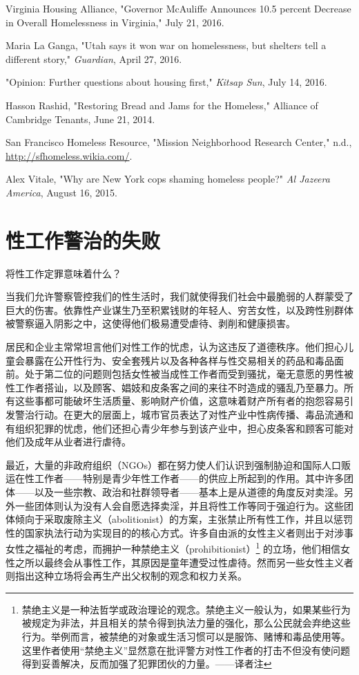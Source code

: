 \documentclass[fontset=fandol, a4paper, 12pt, openright]{ctexbook}
\begin{document}
\begin{enumerate}[label={[\arabic*]}]
    \item Virginia Housing Alliance, "Governor McAuliffe Announces 10.5 percent Decrease in Overall Homelessness in Virginia," July 21, 2016.
    \item Maria La Ganga, "Utah says it won war on homelessness, but shelters tell a different story," \textit{Guardian}, April 27, 2016.
    \item "Opinion: Further questions about housing first," \textit{Kitsap Sun}, July 14, 2016.
    \item Hasson Rashid, "Restoring Bread and Jams for the Homeless," Alliance of Cambridge Tenants, June 21, 2014.
    \item San Francisco Homeless Resource, "Mission Neighborhood Research Center," n.d., \url{http://sfhomeless.wikia.com/}.
    \item Alex Vitale, "Why are New York cops shaming homeless people?" \textit{Al Jazeera America}, August 16, 2015.
\end{enumerate}

\chapter{性工作警治的失败}

将性工作定罪意味着什么？

当我们允许警察管控我们的性生活时，我们就使得我们社会中最脆弱的人群蒙受了巨大的伤害。依靠性产业谋生乃至积累钱财的年轻人、穷苦女性，以及跨性别群体被警察逼入阴影之中，这使得他们极易遭受虐待、剥削和健康损害。

居民和企业主常常坦言他们对性工作的忧虑，认为这违反了道德秩序。他们担心儿童会暴露在公开性行为、安全套残片以及各种各样与性交易相关的药品和毒品面前。处于第二位的问题则包括女性被当成性工作者而受到骚扰，毫无意愿的男性被性工作者搭讪，以及顾客、娼妓和皮条客之间的来往不时造成的骚乱乃至暴力。所有这些事都可能破坏生活质量、影响财产价值，这意味着财产所有者的抱怨容易引发警治行动。在更大的层面上，城市官员表达了对性产业中性病传播、毒品流通和有组织犯罪的忧虑，他们还担心青少年参与到该产业中，担心皮条客和顾客可能对他们及成年从业者进行虐待。

最近，大量的非政府组织（NGOs）都在努力使人们认识到强制胁迫和国际人口贩运在性工作者——特别是青少年性工作者——的供应上所起到的作用。其中许多团体——以及一些宗教、政治和社群领导者——基本上是从道德的角度反对卖淫。另外一些团体则认为没有人会自愿选择卖淫，并且将性工作等同于强迫行为。这些团体倾向于采取废除主义（abolitionist）的方案，主张禁止所有性工作，并且以惩罚性的国家执法行动为实现目的的核心方式。许多自由派的女性主义者则出于对涉事女性之福祉的考虑，而拥护一种禁绝主义（prohibitionist）\footnote{禁绝主义是一种法哲学或政治理论的观念。禁绝主义一般认为，如果某些行为被规定为非法，并且相关的禁令得到执法力量的强化，那么公民就会弃绝这些行为。举例而言，被禁绝的对象或生活习惯可以是服饰、赌博和毒品使用等。这里作者使用“禁绝主义”显然意在批评警方对性工作者的打击不但没有使问题得到妥善解决，反而加强了犯罪团伙的力量。——译者注} 的立场，他们相信女性之所以最终会从事性工作，其原因是童年遭受过性虐待。然而另一些女性主义者则指出这种立场将会再生产出父权制的观念和权力关系。
\end{document}
